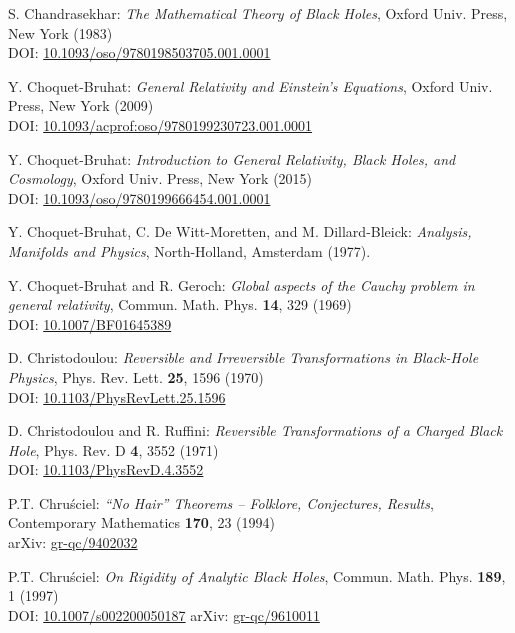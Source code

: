 \begin{thebibliography}{123}
S. Chandrasekhar: {\em The Mathematical Theory of Black Holes},
Oxford Univ. Press, New York (1983)\\
DOI: \href{https://doi.org/10.1093/oso/9780198503705.001.0001}{10.1093/oso/9780198503705.001.0001}

Y. Choquet-Bruhat: {\em General Relativity and Einstein's Equations},
Oxford Univ. Press, New York (2009)\\
DOI: \href{https://doi.org/10.1093/acprof:oso/9780199230723.001.0001}{10.1093/acprof:oso/9780199230723.001.0001}

Y. Choquet-Bruhat: {\em Introduction to General Relativity, Black Holes, and
Cosmology}, Oxford Univ. Press, New York (2015)\\
DOI: \href{https://doi.org/10.1093/oso/9780199666454.001.0001}{10.1093/oso/9780199666454.001.0001}

Y. Choquet-Bruhat, C. De Witt-Moretten, and M. Dillard-Bleick:
{\em Analysis, Manifolds and Physics},
North-Holland, Amsterdam (1977).

Y. Choquet-Bruhat and R. Geroch:
{\em Global aspects of the Cauchy problem in general relativity},
Commun. Math. Phys. {\bf 14}, 329 (1969)\\
DOI: \href{https://doi.org/10.1007/BF01645389}{10.1007/BF01645389}

D. Christodoulou:
{\em Reversible and Irreversible Transformations in Black-Hole Physics},
Phys. Rev. Lett. {\bf 25}, 1596 (1970)\\
DOI: \href{https://doi.org/10.1103/PhysRevLett.25.1596}{10.1103/PhysRevLett.25.1596}

D. Christodoulou and R. Ruffini:
{\em Reversible Transformations of a Charged Black Hole},
Phys. Rev. D {\bf 4}, 3552 (1971)\\
DOI: \href{https://doi.org/10.1103/PhysRevD.4.3552}{10.1103/PhysRevD.4.3552}

P.T. Chru\'sciel:
{\em ``No Hair'' Theorems -- Folklore, Conjectures, Results},
Contemporary Mathematics {\bf 170}, 23 (1994)\\
arXiv: \href{https://arxiv.org/abs/gr-qc/9402032}{gr-qc/9402032}

P.T. Chru\'sciel: {\em On Rigidity of Analytic Black Holes},
Commun. Math. Phys. {\bf 189}, 1 (1997) \\
DOI: \href{https://doi.org/10.1007/s002200050187}{10.1007/s002200050187}\hfill
arXiv: \href{https://arxiv.org/abs/gr-qc/9610011}{gr-qc/9610011}


\end{thebibliography}
